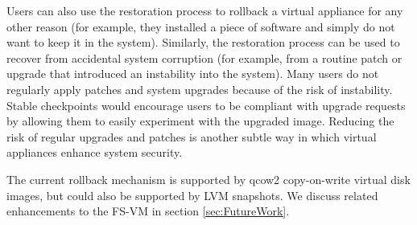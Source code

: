 Users can also use the restoration process to rollback a virtual appliance for any other reason (for example, they installed a piece of software and simply do not want to keep it in the system). Similarly, the restoration process can be used to recover from accidental system corruption (for example, from a routine patch or upgrade that introduced an instability into the system). Many users do not regularly apply patches and system upgrades because of the risk of instability. Stable checkpoints would encourage users to be compliant with upgrade requests by allowing them to easily experiment with the upgraded image. Reducing the risk of regular upgrades and patches is another subtle way in which virtual appliances enhance system security.

The current rollback mechanism is supported by qcow2 copy-on-write virtual disk images, but could also be supported by LVM snapshots. We discuss related enhancements to the FS-VM in section \ref{sec:FutureWork}.

